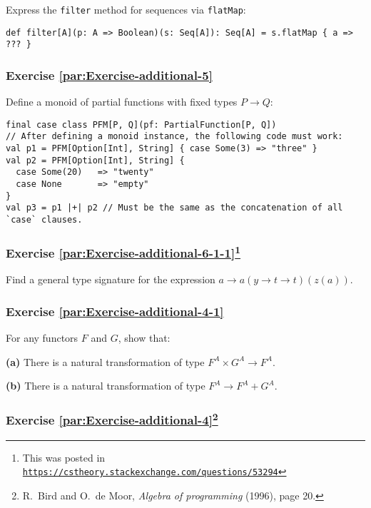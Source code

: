 Express the \lstinline!filter! method for sequences via \lstinline!flatMap!:
\begin{lstlisting}
def filter[A](p: A => Boolean)(s: Seq[A]): Seq[A] = s.flatMap { a => ??? }
\end{lstlisting}


\subsubsection{Exercise \label{par:Exercise-additional-5}\ref{par:Exercise-additional-5}}

Define a monoid of partial functions with fixed types $P\rightarrow Q$:
\begin{lstlisting}
final case class PFM[P, Q](pf: PartialFunction[P, Q])
// After defining a monoid instance, the following code must work:
val p1 = PFM[Option[Int], String] { case Some(3) => "three" }
val p2 = PFM[Option[Int], String] {
  case Some(20)   => "twenty"
  case None       => "empty"
}
val p3 = p1 |+| p2 // Must be the same as the concatenation of all `case` clauses.
\end{lstlisting}


\subsubsection{Exercise \label{par:Exercise-additional-6-1-1}\ref{par:Exercise-additional-6-1-1}\protect\footnote{This was posted in \texttt{\protect\href{https://cstheory.stackexchange.com/questions/53294}{https://cstheory.stackexchange.com/questions/53294}}}}

Find a general type signature for the expression $a\rightarrow a(y\rightarrow t\rightarrow t)(z(a))$. 

\subsubsection{Exercise \label{par:Exercise-additional-4-1}\ref{par:Exercise-additional-4-1}}

For any functors $F$ and $G$, show that:

\textbf{(a)} There is a natural transformation of type $F^{A}\times G^{A}\rightarrow F^{A}$.

\textbf{(b)} There is a natural transformation of type $F^{A}\rightarrow F^{A}+G^{A}$.

\subsubsection{Exercise \label{par:Exercise-additional-4}\ref{par:Exercise-additional-4}\protect\footnote{R.~Bird and O.~de Moor, \emph{Algebra of programming} (1996), page
20.}}

